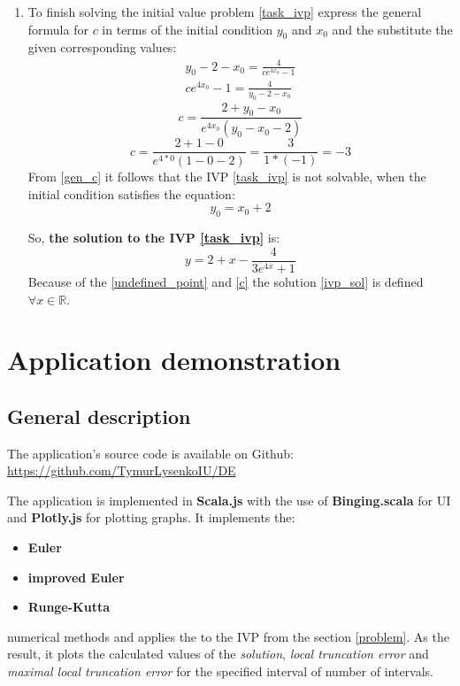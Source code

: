 \documentclass[12pt,a4paper,titlepage]{article}
\begin{document}
\begin{enumerate}
    \item To finish solving the initial value problem \eqref{task_ivp} express the general formula for $c$ in terms of the initial condition $y_0$ and $x_0$ and the substitute the given corresponding values:
    \begin{gather*}
      y_0 - 2 - x_0 = \frac{4}{ce^{4x_0} - 1} \\
      ce^{4x_0} - 1 = \frac{4}{y_0 - 2 - x_0}
    \end{gather*}
    \begin{equation} \label{gen_c}
      c = \frac{2 + y_0 - x_0}{e^{4x_0}(y_0 - x_0 - 2)}
    \end{equation}
    \begin{equation} \label{c}
      c = \frac{2 + 1 - 0}{e^{4*0}(1 - 0 - 2)} = \frac{3}{1*(-1)} = -3
    \end{equation}
    From \eqref{gen_c} it follows that the IVP \eqref{task_ivp} is not solvable, when the initial condition satisfies the equation:
    \begin{equation}
      y_0 = x_0 + 2
    \end{equation}

    So, \textbf{the solution to the IVP \eqref{task_ivp}} is:
    \begin{equation} \label{ivp_sol}
      y = 2 + x - \frac{4}{3e^{4x} + 1}
    \end{equation}
    Because of the \eqref{undefined_point} and \eqref{c} the solution \eqref{ivp_sol} is defined $\forall x \in \mathbb{R}$.
  \end{enumerate}


  \newpage
  \section{Application demonstration}

  \subsection{General description}

  The application's source code is available on Github: \url{https://github.com/TymurLysenkoIU/DE}

  The application is implemented in \textbf{Scala.js} with the use of \textbf{Binging.scala} for UI and \textbf{Plotly.js} for plotting graphs. It implements the:
  \begin{itemize}
    \item \textbf{Euler}
    \item \textbf{improved Euler}
    \item \textbf{Runge-Kutta}
  \end{itemize}
  numerical methods and applies the to the IVP from the section \ref{problem}. As the result, it plots the calculated values of the \textit{solution}, \textit{local truncation error} and \textit{maximal local truncation error} for the specified interval of number of intervals.
\end{document}
